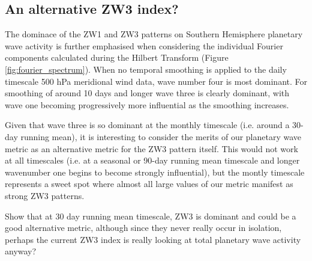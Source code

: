 \subsection{An alternative ZW3 index?}

The dominace of the ZW1 and ZW3 patterns on Southern Hemisphere planetary wave activity is further emphasised when considering the individual Fourier components calculated during the Hilbert Transform (Figure \ref{fig:fourier_spectrum}). When no temporal smoothing is applied to the daily timescale 500 hPa meridional wind data, wave number four is most dominant. For smoothing of around 10 days and longer wave three is clearly dominant, with wave one becoming progressively more influential as the smoothing increases.

Given that wave three is so dominant at the monthly timescale (i.e. around a 30-day running mean), it is interesting to consider the merits of our planetary wave metric as an alternative metric for the ZW3 pattern itself. This would not work at all timescales (i.e. at a seasonal or 90-day running mean timescale and longer wavenumber one begins to become strongly influential), but the montly timescale represents a sweet spot where almost all large values of our metric manifest as strong ZW3 patterns. 


Show that at 30 day running mean timescale, ZW3 is dominant and could be a good alternative metric, although since they never really occur in isolation, perhaps the current ZW3 index is really looking at total planetary wave activity anyway?